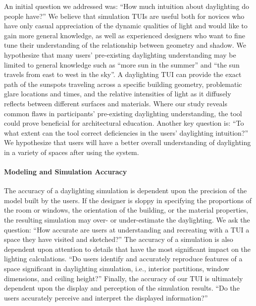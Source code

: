 An initial question we addressed was: ``How much intuition about
daylighting do people have?''  We believe that simulation TUIs are
useful both for novices who have only casual appreciation of the
dynamic qualities of light and would like to gain more general
knowledge, as well as experienced designers who want to fine tune
their understanding of the relationship between geometry and shadow.
We hypothesize that many users' pre-existing daylighting understanding
may be limited to general knowledge such as ``more sun in the summer''
and ``the sun travels from east to west in the sky''.  A daylighting
TUI can provide the exact path of the sunspots traveling across a
specific building geometry, problematic glare locations and times, and
the relative intensities of light as it diffusely reflects between
different surfaces and materials.  Where our study reveals common
flaws in participants' pre-existing daylighting understanding, the
tool could prove beneficial for architectural education.  Another key
question is: ``To what extent can the tool correct deficiencies in the
users' daylighting intuition?''  We hypothesize that users will have a
better overall understanding of daylighting in a variety of spaces
after using the system.





\paragraph{Modeling and Simulation Accuracy}


The accuracy of a daylighting simulation is dependent upon the
precision of the model built by the users.  If the designer is sloppy
in specifying the proportions of the room or windows, the orientation
of the building, or the material properties, the resulting simulation
may over- or under-estimate the daylighting.  We ask the question:
``How accurate are users at understanding and recreating with a TUI a
space they have visited and sketched?''
%
The accuracy of a simulation is also dependent upon attention to
details that have the most significant impact on the lighting
calculations.  ``Do users identify and accurately reproduce features
of a space significant in daylighting simulation, i.e., interior
partitions, window dimensions, and ceiling height?''
%
Finally, the accuracy of our TUI is ultimately dependent upon the
display and perception of the simulation results.  ``Do the users
accurately perceive and interpret the displayed information?''  

